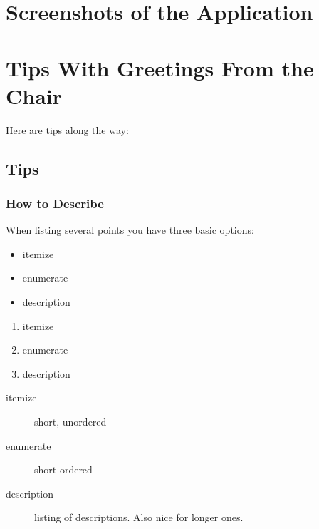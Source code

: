 \documentclass[
			   fontsize=11pt,
               paper=a4,
               bibliography=totoc,
               idxtotoc,
               headsepline,
               footsepline,
               footinclude=false,
               BCOR=12mm,
               DIV=13,
               openany,   %
               ]
               {scrbook}
\begin{document}

\appendix

\chapter{Screenshots of the Application}

\chapter{Tips With Greetings From the Chair}
\label{sec:tips}       %
Here are tips along the way:

\section{Tips}
\subsection{How to Describe}
\setlength{\columnsep}{30 pt}
When listing several points you have three basic options:
\begin{multicols}{3}
	\begin{itemize}
		\item itemize
		\item enumerate
		\item description
	\end{itemize}
	
	\vfill\null
	\columnbreak
	
	\begin{enumerate}
		\item itemize
		\item enumerate
		\item description
	\end{enumerate}
	
	\vfill\null
	\columnbreak
	
	\begin{description}
		\item[itemize] short, unordered
		\item[enumerate] short ordered
		\item[description] listing of descriptions. Also nice for longer ones.
	\end{description}
	
\end{multicols}
\end{document}
